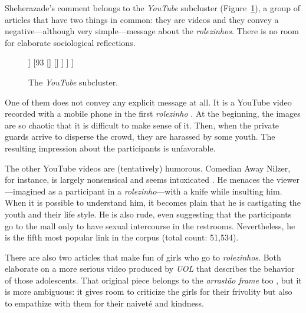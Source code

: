 Sheherazade's comment belongs to the \emph{YouTube} subcluster (Figure~\ref{youtube_subcluster}), a group of articles that have two things in common: they are videos and they convey a negative---although very simple---message about the \emph{rolezinhos}. There is no room for elaborate sociological reflections.

\begin{figure}
\centering
\begin{forest}
[70, for tree={grow=east,anchor=west,child anchor=west}
	[{\autocite[][Sheherazade: \emph{Rolezinho} as \emph{arrastão}]{youtube_rachel}}]
	[81
		[99
			[{\autocite[][Chaotic footage: First \emph{rolezinho}]{youtube_primeiro_rolezinho_outside}}]
			[{\autocite[][Parody: Girls in \emph{rolezinho}]{youtube_parodia_rolezeiras}}]
		]
		[93
			[{\autocite[][Comedian Away Nilzer on \emph{rolezinhos}]{youtube_away}}]
			[{\autocite[][Comments on video \enquote{Girls in \emph{rolezinho}}]{diva_rolezeiras}}]
		]
	]
]
\end{forest}
\caption{The \emph{YouTube} subcluster.}
\label{youtube_subcluster}
\end{figure}

One of them does not convey any explicit message at all. It is a YouTube video recorded with a mobile phone in the first \emph{rolezinho} \autocite{youtube_primeiro_rolezinho_outside}. At the beginning, the images are so chaotic that it is difficult to make sense of it. Then, when the private guards arrive to disperse the crowd, they are harassed by some youth. The resulting impression about the participants is unfavorable.

The other YouTube videos are (tentatively) humorous. Comedian Away Nilzer, for instance, is largely nonsensical and seems intoxicated \autocite{youtube_away}. He menaces the viewer---imagined as a participant in a \emph{rolezinho}---with a knife while insulting him. When it is possible to understand him, it becomes plain that he is castigating the youth and their life style. He is also rude, even suggesting that the participants go to the mall only to have sexual intercourse in the restrooms. Nevertheless, he is the fifth most popular link in the corpus (total count: 51,534).

There are also two articles that make fun of girls who go to \emph{rolezinhos}. Both elaborate on a more serious video produced by \emph{UOL} that describes the behavior of those adolescents. That original piece belongs to the \emph{arrastão frame} too \autocite{uol_rolezeiras}, but it is more ambiguous: it gives room to criticize the girls for their frivolity but also to empathize with them for their naiveté and kindness.

